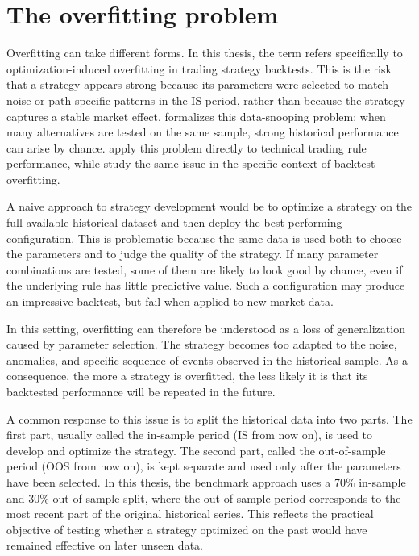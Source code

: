 \section{The overfitting problem}

Overfitting can take different forms. In this thesis, the term refers specifically to
optimization-induced overfitting in trading strategy backtests. This is the risk that a strategy
appears strong because its parameters were selected to match noise or path-specific patterns in the
IS period, rather than because the strategy captures a stable market effect. \citet{white2000}
formalizes this data-snooping problem: when many alternatives are tested on the same sample, strong
historical performance can arise by chance. \citet{sullivan1999} apply this problem directly to
technical trading rule performance, while \citet{bailey2017} study the same issue in the specific
context of backtest overfitting.

A naive approach to strategy development would be to optimize a strategy on the full available
historical dataset and then deploy the best-performing configuration. This is problematic because
the same data is used both to choose the parameters and to judge the quality of the strategy. If
many parameter combinations are tested, some of them are likely to look good by chance, even if the
underlying rule has little predictive value. Such a configuration may produce an impressive
backtest, but fail when applied to new market data.

In this setting, overfitting can therefore be understood as a loss of generalization caused by
parameter selection. The strategy becomes too adapted to the noise, anomalies, and specific sequence
of events observed in the historical sample. As a consequence, the more a strategy is overfitted,
the less likely it is that its backtested performance will be repeated in the future.

A common response to this issue is to split the historical data into two parts. The first part,
usually called the in-sample period (IS from now on), is used to develop and optimize the strategy.
The second part, called the out-of-sample period (OOS from now on), is kept separate and used only
after the parameters have been selected. In this thesis, the benchmark approach uses a 70\%
in-sample and 30\% out-of-sample split, where the out-of-sample period corresponds to the most
recent part of the original historical series. This reflects the practical objective of testing
whether a strategy optimized on the past would have remained effective on later unseen data.

